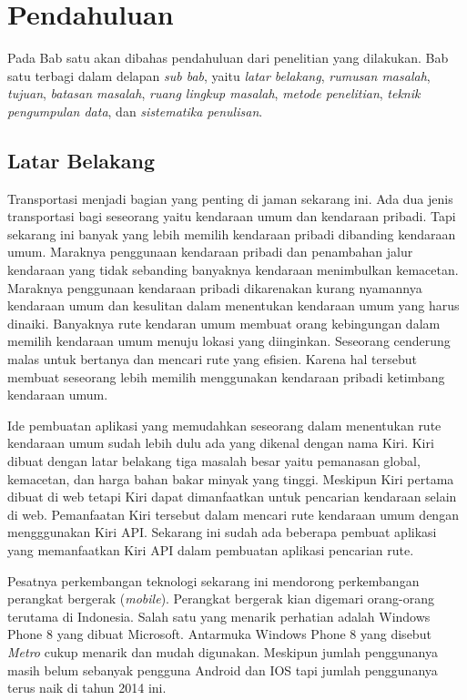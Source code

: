 \chapter{Pendahuluan}
\label{chap:intro}

Pada Bab satu akan dibahas pendahuluan dari penelitian yang dilakukan. Bab satu terbagi dalam delapan \textit{sub bab}, yaitu \textit{latar belakang}, \textit{rumusan masalah}, \textit{tujuan}, \textit{batasan masalah}, \textit{ruang lingkup masalah}, \textit{metode penelitian}, \textit{teknik pengumpulan data}, dan \textit{sistematika penulisan}.

\section{Latar Belakang}
\label{sec:latar_belakang}
\hspace{0.5cm} Transportasi menjadi bagian yang penting di jaman sekarang ini. Ada dua jenis transportasi bagi seseorang yaitu kendaraan umum dan kendaraan pribadi. Tapi sekarang ini banyak yang lebih memilih kendaraan pribadi dibanding kendaraan umum. Maraknya penggunaan kendaraan pribadi dan penambahan jalur kendaraan yang tidak sebanding banyaknya kendaraan menimbulkan kemacetan. Maraknya penggunaan kendaraan pribadi dikarenakan kurang nyamannya kendaraan umum dan kesulitan dalam menentukan kendaraan umum yang harus dinaiki. Banyaknya rute kendaran umum membuat orang kebingungan dalam memilih kendaraan umum menuju lokasi yang diinginkan. Seseorang cenderung malas untuk bertanya dan mencari rute yang efisien. Karena hal tersebut membuat seseorang lebih memilih menggunakan kendaraan pribadi ketimbang kendaraan umum. 

\hspace{0.5cm} Ide pembuatan aplikasi yang memudahkan seseorang dalam menentukan rute kendaraan umum sudah lebih dulu ada yang dikenal dengan nama Kiri. Kiri dibuat dengan latar belakang tiga masalah besar yaitu pemanasan global, kemacetan, dan harga bahan bakar minyak yang tinggi. Meskipun Kiri pertama dibuat di web tetapi Kiri dapat dimanfaatkan untuk pencarian kendaraan selain di web. Pemanfaatan Kiri tersebut dalam mencari rute kendaraan umum dengan mengggunakan Kiri API. Sekarang ini sudah ada beberapa pembuat aplikasi yang memanfaatkan Kiri API dalam pembuatan aplikasi pencarian rute.  
 
\hspace{0.5cm} Pesatnya perkembangan teknologi sekarang ini mendorong perkembangan perangkat bergerak (\textit{mobile}). Perangkat bergerak kian digemari orang-orang terutama di Indonesia. Salah satu yang menarik perhatian adalah Windows Phone 8 yang dibuat Microsoft. Antarmuka Windows Phone 8 yang disebut \textit{Metro} cukup menarik dan mudah digunakan. Meskipun jumlah penggunanya masih belum sebanyak pengguna Android dan IOS tapi jumlah penggunanya terus naik di tahun 2014 ini.    

